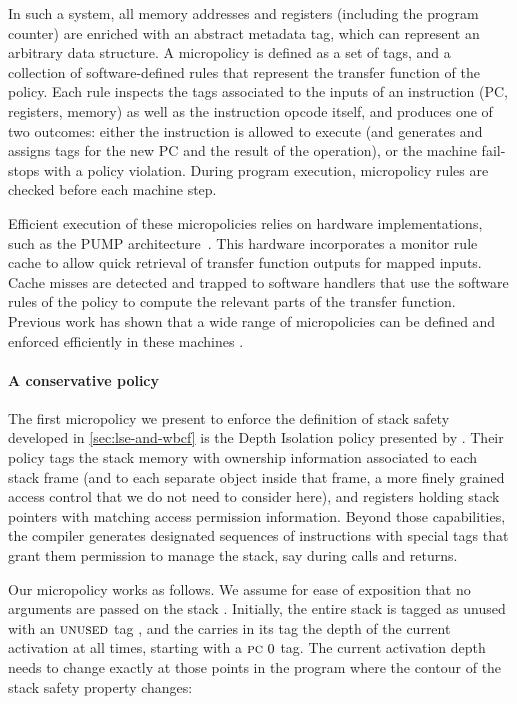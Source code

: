 \documentclass[acmsmall,review,anonymous]{acmart}\settopmatter{printfolios=true,printccs=false,printacmref=false}
\begin{document}
In such a system, all memory addresses and registers (including the program
counter) are enriched with an abstract metadata tag, which can represent an
arbitrary data structure. A micropolicy is defined as a set of tags, and a
collection of software-defined rules that represent the transfer function of the
policy. Each rule inspects the tags associated to the inputs of an instruction
(PC, registers, memory) as well as the instruction opcode itself, and produces
one of two outcomes: either the instruction is allowed to execute (and generates
and assigns tags for the new PC and the result of the operation), or the machine
fail-stops with a policy violation. During program execution, micropolicy rules
are checked before each machine step.

Efficient execution of these micropolicies relies on hardware implementations,
such as the PUMP architecture~\citep{pump_oakland15}. This hardware incorporates
a monitor rule cache to allow quick retrieval of transfer function outputs for
mapped inputs. Cache misses are detected and trapped to software handlers that
use the software rules of the policy to compute the relevant parts of the
transfer function. Previous work has shown that a wide range of micropolicies
can be defined and enforced efficiently in these machines
\citep{pump_oakland2015}.
%

\paragraph*{A conservative policy}
%
The first micropolicy we present to enforce the definition of stack
safety developed in \cref{sec:lse-and-wbcf} is   the Depth Isolation policy presented by
\citet{DBLP:conf/sp/RoesslerD18}. Their policy tags the stack memory
with ownership information associated to each stack frame (and to each
separate object inside that frame, a more finely grained access
control that we do not need to consider here), and registers holding
stack pointers with matching access permission information. Beyond
those capabilities, the compiler generates designated sequences of
instructions with special tags that grant them permission to manage
the stack, say during calls and returns. 

Our micropolicy works as follows. We assume for ease of exposition that no
arguments are passed on the stack . Initially, the
entire stack is tagged as unused with an $\textsc{unused}$ tag , and the {\PCname}
carries in its tag the depth of the current activation at all times, starting
with a $\textsc{pc} ~ 0$ tag. The current activation depth needs to change
exactly at those points in the program where the contour of the stack safety
property changes:
\end{document}
